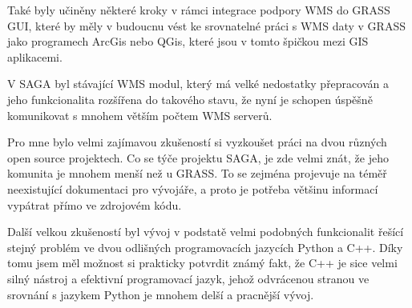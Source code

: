 \documentclass[a4paper,12pt]{article}
\begin{document}
Také byly učiněny některé kroky v rámci integrace  podpory WMS 
do GRASS GUI, které by měly v budoucnu vést ke srovnatelné práci s WMS daty
v GRASS jako programech ArcGis nebo QGis, které jsou v tomto špičkou 
mezi GIS aplikacemi.

V SAGA byl stávající WMS modul, který má velké nedostatky přepracován
 a jeho funkcionalita rozšířena do takového stavu, že nyní je schopen 
 úspěšně komunikovat s mnohem větším počtem WMS serverů.

Pro mne bylo velmi zajímavou zkušeností si vyzkoušet práci na dvou
různých open source projektech. Co se týče projektu SAGA, je zde velmi
znát, že jeho komunita je mnohem menší než u GRASS. To se zejména
projevuje na téměř neexistující dokumentaci pro vývojáře, a proto je
potřeba většinu informací vypátrat přímo ve zdrojovém kódu.

Další velkou zkušeností byl vývoj v podstatě velmi podobných
funkcionalit řešící stejný problém ve dvou odlišných programovacích
jazycích Python a C++.  Díky tomu jsem měl možnost si prakticky potvrdit
známý fakt, že C++ je sice velmi silný nástroj a efektivní programovací 
jazyk, jehož odvrácenou stranou ve srovnání s jazykem Python je mnohem 
delší a pracnější vývoj.
\end{document}
